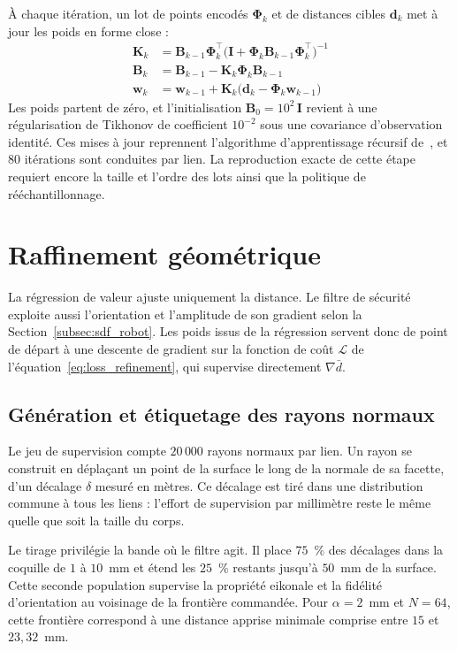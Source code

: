 À chaque itération, un lot de points encodés $\boldsymbol{\Phi}_k$ et de distances cibles $\mathbf{d}_k$ met à jour les poids en forme close :
\begin{align}
  \mathbf{K}_k &= \mathbf{B}_{k-1}\boldsymbol{\Phi}_k^{\top}\big(\mathbf{I}+\boldsymbol{\Phi}_k\mathbf{B}_{k-1}\boldsymbol{\Phi}_k^{\top}\big)^{-1} \\
  \mathbf{B}_k &= \mathbf{B}_{k-1}-\mathbf{K}_k\boldsymbol{\Phi}_k\mathbf{B}_{k-1} \\
  \mathbf{w}_k &= \mathbf{w}_{k-1}+\mathbf{K}_k\big(\mathbf{d}_k-\boldsymbol{\Phi}_k\mathbf{w}_{k-1}\big)
\end{align}
Les poids partent de zéro, et l'initialisation $\mathbf{B}_0 = 10^{2}\,\mathbf{I}$ revient à une régularisation de Tikhonov de coefficient $10^{-2}$ sous une covariance d'observation identité. Ces mises à jour reprennent l'algorithme d'apprentissage récursif de~\cite{Li2024rdf}, et $80$ itérations sont conduites par lien. La reproduction exacte de cette étape requiert encore la taille et l'ordre des lots ainsi que la politique de rééchantillonnage.

\section*{Raffinement géométrique}

La régression de valeur ajuste uniquement la distance. Le filtre de sécurité exploite aussi l'orientation et l'amplitude de son gradient selon la Section~\ref{subsec:sdf_robot}. Les poids issus de la régression servent donc de point de départ à une descente de gradient sur la fonction de coût $\mathcal{L}$ de l'équation~\eqref{eq:loss_refinement}, qui supervise directement $\nabla \bar{d}$.

\subsection*{Génération et étiquetage des rayons normaux}

Le jeu de supervision compte $20\,000$ rayons normaux par lien. Un rayon se construit en déplaçant un point de la surface le long de la normale de sa facette, d'un décalage $\delta$ mesuré en mètres. Ce décalage est tiré dans une distribution commune à tous les liens : l'effort de supervision par millimètre reste le même quelle que soit la taille du corps.

Le tirage privilégie la bande où le filtre agit. Il place $75$~\% des décalages dans la coquille de $1$ à $10$~mm et étend les $25$~\% restants jusqu'à $50$~mm de la surface. Cette seconde population supervise la propriété eikonale et la fidélité d'orientation au voisinage de la frontière commandée. Pour $\alpha=2$~mm et $N=64$, cette frontière correspond à une distance apprise minimale comprise entre $15$ et $23{,}32$~mm.

